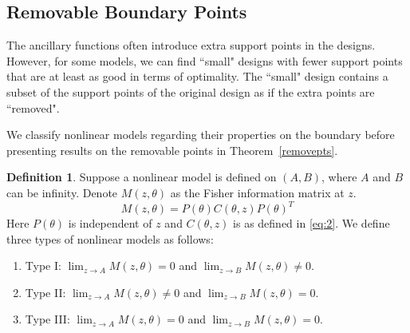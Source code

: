 \documentclass[12pt]{amsart}
\newtheorem{lemma}[theorem]{Lemma}
\theoremstyle{definition}
\newtheorem{definition}{Definition}[section]
\theoremstyle{remark}
\numberwithin{equation}{section}
\begin{document}
 

 








 
 
\subsection{Removable Boundary Points}
The ancillary functions often introduce extra support points in the designs. However, for some models, we can find ``small" designs with fewer support points that are at least as good in terms of optimality. The ``small" design contains a subset of the support points of the original design as if the extra points are ``removed". 

We classify nonlinear models regarding their properties on the boundary before presenting results on the removable points in Theorem~\ref{removepts}.

\begin{definition} Suppose a nonlinear model is defined on $(A,B)$, where $A$ and $B$ can be infinity. Denote $M(z,\theta)$ as the Fisher information matrix at $z$. \[
M(z,\theta)  = P(\theta)C(\theta,z)P(\theta)^T\] Here $P(\theta)$ is independent of $z$ and $C(\theta,z)$ is as defined in \eqref{eq:2}. We define three types of nonlinear models as follows: \begin{enumerate}
    \item Type I: $\lim_{z\to A}M(z,\theta)=0$ and $\lim_{z\to B}M(z,\theta)\ne 0$.
    \item Type II: $\lim_{z\to A}M(z,\theta)\ne 0$ and $\lim_{z\to B}M(z,\theta)=0$.
    \item Type III: $\lim_{z\to A}M(z,\theta)= 0$ and $\lim_{z\to B}M(z,\theta)=0$.
   \end{enumerate}
\end{definition}
\end{document}
